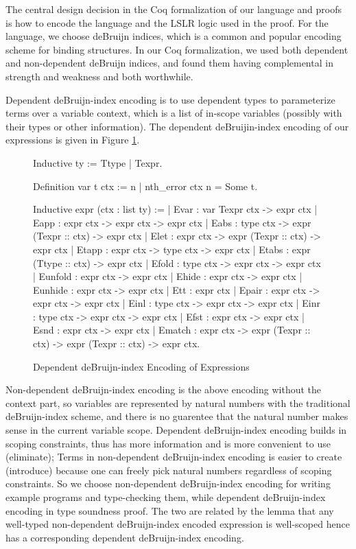 \documentclass[preprint]{sigplanconf}
\begin{document}
The central design decision in the Coq formalization of our language and proofs is how to encode the language and the LSLR logic used in the proof. For the language, we choose deBruijn indices, which is a common and popular encoding scheme for binding structures. In our Coq formalization, we used both dependent and non-dependent deBruijn indices, and found them having complemental in strength and weakness and both worthwhile.

Dependent deBruijn-index encoding is to use dependent types to parameterize terms over a variable context, which is a list of in-scope variables (possibly with their types or other information). The dependent deBruijin-index encoding of our expressions is given in Figure \ref{coq-depdeb}.

\begin{figure}
\begin{coq}
Inductive ty := Ttype | Texpr.

Definition var t ctx := {n | nth_error ctx n = Some t}.

Inductive expr (ctx : list ty) :=
| Evar : var Texpr ctx -> expr ctx
| Eapp : expr ctx -> expr ctx -> expr ctx
| Eabs : type ctx -> expr (Texpr :: ctx) -> expr ctx
| Elet : expr ctx -> expr (Texpr :: ctx) -> expr ctx
| Etapp : expr ctx -> type ctx -> expr ctx
| Etabs : expr (Ttype :: ctx) -> expr ctx
| Efold : type ctx -> expr ctx -> expr ctx
| Eunfold : expr ctx -> expr ctx
| Ehide : expr ctx -> expr ctx
| Eunhide : expr ctx -> expr ctx
| Ett : expr ctx
| Epair : expr ctx -> expr ctx -> expr ctx
| Einl : type ctx -> expr ctx -> expr ctx
| Einr : type ctx -> expr ctx -> expr ctx
| Efst : expr ctx -> expr ctx
| Esnd : expr ctx -> expr ctx
| Ematch : expr ctx -> expr (Texpr :: ctx) -> expr (Texpr :: ctx) -> expr ctx.
\end{coq}
\caption{\label{coq-depdeb}Dependent deBruijn-index Encoding of Expressions}
\end{figure}

Non-dependent deBruijn-index encoding is the above encoding without the context part, so variables are represented by natural numbers with the traditional deBruijn-index scheme, and there is no guarentee that the natural number makes sense in the current variable scope. Dependent deBruijn-index encoding builds in scoping constraints, thus has more information and is more convenient to use (eliminate); Terms in non-dependent deBruijn-index encoding is easier to create (introduce) because one can freely pick natural numbers regardless of scoping constraints. So we choose non-dependent deBruijn-index encoding for writing example programs and type-checking them, while dependent deBruijn-index encoding in type soundness proof. The two are related by the lemma that any well-typed non-dependent deBruijn-index encoded expression is well-scoped hence has a corresponding dependent deBruijn-index encoding.
\end{document}
